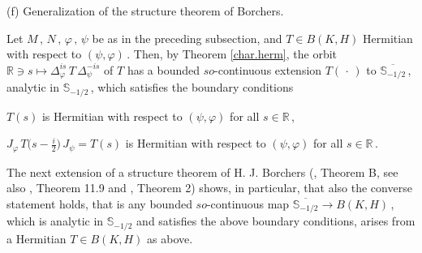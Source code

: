 \documentclass[reqno]{amsart}
\theoremstyle{definition}
\theoremstyle{remark}
\numberwithin{equation}{section}
\theoremstyle{plain}
\begin{document}
\bigskip
\noindent (f) {\sc Generalization of the structure theorem of
Borchers}.
\bigskip

Let $M\, ,\, N\, ,\,\varphi\, ,\,\psi$ be as in the preceding
subsection, and $T\in B(K,H)$ Hermitian with respect to
$(\psi ,\varphi )\,$. Then, by Theorem \ref{char.herm}, the
orbit $\mathbb R\ni s\longmapsto\Delta_\varphi^{is}\, T\,
\Delta_\psi^{-is}$ of $T$ has a bounded $so$-continuous extension
$T(\,\cdot\, )$ to $\overline{\mathbb S_{-1/2}}\,$, analytic in
$\mathbb S_{-1/2}\,$, which satisfies the boundary conditions
\begin{center}
$T(s)$ is Hermitian with respect to $(\psi ,\varphi )$
for all $s\in \mathbb R\,$,
\end{center}
\begin{center}
$\displaystyle J_\varphi\, T\Big(s-\frac i2\Big)\, J_\psi =T(s)$
is Hermitian with respect to $(\psi ,\varphi )$
for all $s\in \mathbb R\,$.
\end{center}
The next extension of a structure theorem of H. J. Borchers
(\cite{Bo3}, Theorem B, see also \cite{Bo2}, Theorem 11.9 and
\cite{Wie1}, Theorem 2) shows, in particular, that also the converse
statement holds, that is any bounded $so$-continuous map
$\overline{\mathbb S_{-1/2}}\longrightarrow B(K,H)\,$, which is
analytic in $\mathbb S_{-1/2}$ and satisfies the above boundary
conditions, arises from a Hermitian $T\in B(K,H)$ as above.
\smallskip
\end{document}
